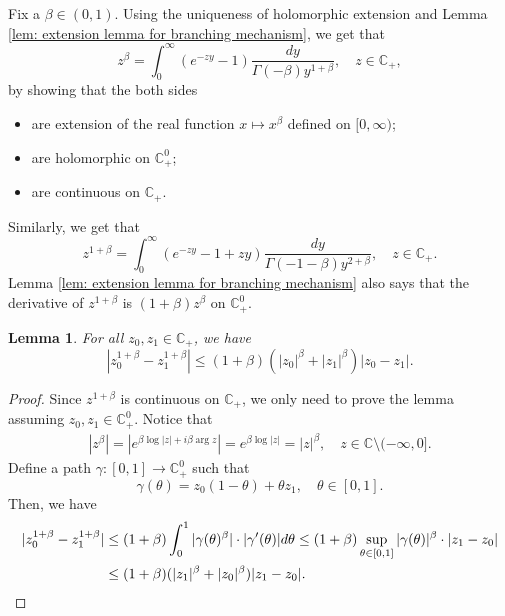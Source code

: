 \documentclass[12pt,a4paper]{amsart}
\theoremstyle{plain}
\newtheorem{lem}[thm]{Lemma}
\theoremstyle{definition}
\numberwithin{equation}{section}
\begin{document}
    Fix a $\beta \in (0,1)$.
    Using the uniqueness of holomorphic extension and Lemma \ref{lem: extension lemma for branching mechanism}, we get that
\begin{equation}
    z^{\beta}
	= \int_0^\infty (e^{-zy}-1) \frac{dy}{\Gamma(-\beta)y^{1+\beta}},
    \quad z\in \mathbb C_+,
\end{equation}
	by showing that the both sides
\begin{itemize}
\item
    are extension of the real function $x\mapsto x^{\beta}$ defined on $[0,\infty)$;
\item
    are holomorphic on $\mathbb C_+^0$;
\item
    are continuous on $\mathbb C_+$.
\end{itemize}
    Similarly, we get that
\begin{equation}
\label{eq: stable branching on C+}
    z^{1+\beta}
    = \int_0^\infty (e^{-zy}-1+zy)\frac{dy}{\Gamma(-1-\beta)y^{2+\beta}},
    \quad z\in \mathbb C_+.
\end{equation}
    Lemma \ref{lem: extension lemma for branching mechanism} also says that the derivative of $z^{1+\beta}$ is $(1+\beta)z^{\beta}$ on $\mathbb C^0_+$.
\begin{lem}
\label{lem: Lip of power function}
    For all $z_0,z_1 \in \mathbb C_+$, we have
\begin{equation}
\label{eq: Lip of power function}
    |z_0^{1+\beta} - z_1^{1+\beta}|
    \leq (1+\beta)(|z_0|^{\beta}+|z_1|^{\beta})|z_0 - z_1|.
\end{equation}

\end{lem}
\begin{proof}
    Since $z^{1+\beta}$ is continuous on $\mathbb C_+$, we only need to prove the lemma assuming $z_0,z_1 \in \mathbb C^0_+$.
    Notice that
\begin{equation}\begin{split}
\label{eq: upper bound for beta power of z}
	|z^\beta|
	= |e^{\beta \log |z| +i\beta \operatorname {arg}z}| = e^{\beta \log |z|} = |z|^\beta,
	\quad z \in \mathbb C\setminus (-\infty, 0].
\end{split}\end{equation}
    Define a path $\gamma: [0,1] \to \mathbb C^0_+$ such that
\[
    \gamma(\theta)
    = z_0 (1-\theta) + \theta z_1,
    \quad \theta \in [0,1].
\]
    Then, we have
\begin{equation}\begin{split}
    |z_0^{1+\beta} - z_1^{1+\beta}|
    &\leq (1+\beta) \int_0^1 |\gamma(\theta)^{\beta}|\cdot |\gamma'(\theta)|d\theta
    \leq (1+\beta)  \sup_{\theta \in [0,1]} |\gamma(\theta)|^{\beta} \cdot |z_1-z_0|
    \\&\leq (1+\beta)  ( |z_1|^{\beta}+|z_0|^{\beta} ) |z_1-z_0|.
    \qedhere
\end{split}\end{equation}
\end{proof}
\end{document}
